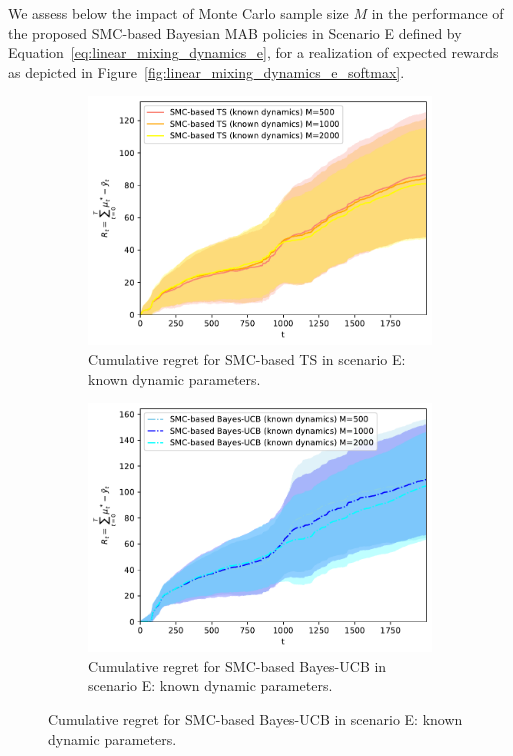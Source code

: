 
We assess below the impact of Monte Carlo sample size $M$ in the performance of the proposed SMC-based Bayesian MAB policies
in Scenario E defined by Equation~\eqref{eq:linear_mixing_dynamics_e},
for a realization of expected rewards as depicted in Figure~\ref{fig:linear_mixing_dynamics_e_softmax}.

\begin{figure}[!h]
\centering
\begin{subfigure}[b]{0.45\textwidth}
\includegraphics[width=\textwidth]{./fods_figs/dynamic/softmax/e_selectedM_cumulative_regret_dknown_ts}
\caption{Cumulative regret for SMC-based TS in scenario E: known dynamic parameters.}
\label{fig:dynamic_bandits_softmax_e_ts_dknown_M}
\end{subfigure}\qquad
\begin{subfigure}[b]{0.45\textwidth}
\includegraphics[width=\textwidth]{./fods_figs/dynamic/softmax/e_selectedM_cumulative_regret_dknown_bucb}
\caption{Cumulative regret for SMC-based Bayes-UCB in scenario E: known dynamic parameters.}
\label{fig:dynamic_bandits_softmax_e_bucb_dknown_M}
\end{subfigure}


\end{figure}
